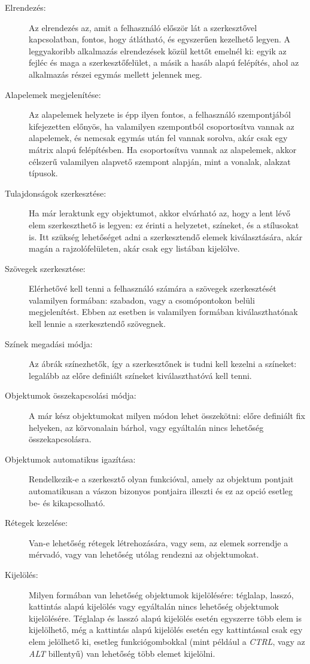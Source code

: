 \begin{description}
	\item[Elrendezés:] Az elrendezés az, amit a felhasználó először lát a szerkesztővel kapcsolatban, fontos, hogy átlátható, és egyszerűen kezelhető legyen. A leggyakoribb alkalmazás elrendezések közül kettőt emelnél ki: egyik az fejléc és maga a szerkesztőfelület, a másik a hasáb alapú felépítés, ahol az alkalmazás részei egymás mellett jelennek meg. 
	\item[Alapelemek megjelenítése:] Az alapelemek helyzete is épp ilyen fontos, a felhasználó szempontjából kifejezetten előnyös, ha valamilyen szempontból csoportosítva vannak az alapelemek, és nemcsak egymás után fel vannak sorolva, akár csak egy mátrix alapú felépítésben. Ha csoportosítva vannak az alapelemek, akkor célszerű valamilyen alapvető szempont alapján, mint a vonalak, alakzat típusok.
	\item[Tulajdonságok szerkesztése:] Ha már leraktunk egy objektumot, akkor elvárható az, hogy a lent lévő elem szerkeszthető is legyen: ez érinti a helyzetet, színeket, és a stílusokat is. Itt szükség lehetőséget adni a szerkesztendő elemek kiválasztására, akár magán a rajzolófelületen, akár csak egy listában kijelölve.
	\item[Szövegek szerkesztése:] Elérhetővé kell tenni a felhasználó számára a szövegek szerkesztését valamilyen formában: szabadon, vagy a csomópontokon belüli megjelenítést. Ebben az esetben is valamilyen formában kiválaszthatónak kell lennie a szerkesztendő szövegnek.
	\item[Színek megadási módja:] Az ábrák színezhetők, így a szerkesztőnek is tudni kell kezelni a színeket: legalább az előre definiált színeket kiválaszthatóvá kell tenni.
	\item[Objektumok összekapcsolási módja:] A már kész objektumokat milyen módon lehet összekötni: előre definiált fix helyeken, az körvonalain bárhol, vagy egyáltalán nincs lehetőség összekapcsolásra. 
	\item[Objektumok automatikus igazítása:] Rendelkezik-e a szerkesztő olyan funkcióval, amely az objektum pontjait automatikusan a vászon bizonyos pontjaira illeszti és ez az opció esetleg be- és kikapcsolható.
	\item[Rétegek kezelése:] Van-e lehetőség rétegek létrehozására, vagy sem, az elemek sorrendje a mérvadó, vagy van lehetőség utólag rendezni az objektumokat. 
	\item[Kijelölés:] Milyen formában van lehetőség objektumok kijelölésére: téglalap, lasszó, kattintás alapú kijelölés vagy egyáltalán nincs lehetőség objektumok kijelölésére. Téglalap és lasszó alapú kijelölés esetén egyszerre több elem is kijelölhető, még a kattintás alapú kijelölés esetén egy kattintással csak egy elem jelölhető ki, esetleg funkciógombokkal (mint például a \textit{CTRL}, vagy az \textit{ALT} billentyű) van lehetőség több elemet kijelölni.

\end{description}
